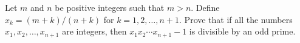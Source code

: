 Let $m$ and $n$ be positive integers such that $m > n$. Define $x_k = (m+k)/(n+k)$ for $k = 1, 2, \ldots, n+1$. Prove that if all the numbers $x_1, x_2, \ldots, x_{n+1}$ are integers, then $x_1 x_2 \cdots x_{n+1} - 1$ is divisible by an odd prime.
